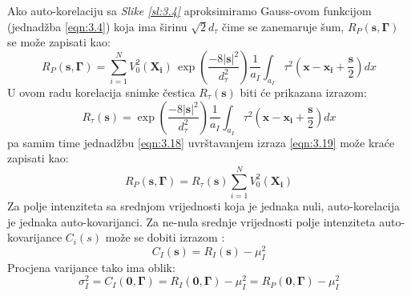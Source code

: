 \par
Ako auto-korelaciju sa \textit{Slike \ref{sl:3.4}} aproksimiramo Gauss-ovom funkcijom (jednadžba \ref{eqn:3.4}) koja ima širinu $\sqrt{2}d_{\tau}$ čime se zanemaruje šum, $R_{P}(\boldsymbol{s},\boldsymbol{\Gamma})$ se može zapisati kao:
\begin{equation}
	R_{P}(\boldsymbol{s},\boldsymbol{\Gamma}) = \sum_{i=1}^{N}V_{0}^{2}(\boldsymbol{X_{i}})\, \exp \left(\dfrac{-8|\boldsymbol{s}|^{2}}{d_{\tau}^{2}}\right)\dfrac{1}{a_{I}}\int_{a_{I}}\tau^{2}\left(\boldsymbol{x}-\boldsymbol{x_{i}}+\dfrac{\boldsymbol{s}}{2}\right)dx
	\label{eqn:3.18}
\end{equation}
U ovom radu korelacija snimke čestica $R_{\tau}(\boldsymbol{s})$ biti će prikazana izrazom:
\begin{equation}
	R_{\tau}(\boldsymbol{s})=\exp \left(\dfrac{-8|\boldsymbol{s}|^{2}}{d_{\tau}^{2}}\right)\dfrac{1}{a_{I}}\int_{a_{I}}\tau^{2}\left(\boldsymbol{x}-\boldsymbol{x_{i}}+\dfrac{\boldsymbol{s}}{2}\right)dx
	\label{eqn:3.19}
\end{equation}
pa samim time jednadžbu \ref{eqn:3.18} uvrštavanjem izraza \ref{eqn:3.19} može kraće zapisati kao:
\begin{equation}
	R_{P}(\boldsymbol{s},\boldsymbol{\Gamma})=R_{\tau}(\boldsymbol{s})\sum_{i=1}^{N}V_{0}^{2}(\boldsymbol{X_{i}})
	\label{eqn:3.20}
\end{equation}
Za polje intenziteta sa srednjom vrijednosti koja je jednaka nuli, auto-korelacija je jednaka auto-kovarijanci. Za ne-nula srednje vrijednosti polje intenziteta auto-kovarijance $C_{i}(s)$ može se dobiti izrazom \cite{raffel2018_book}:
\begin{equation}
	C_{I}(\boldsymbol{s})=R_{I}(\boldsymbol{s})-\mu_{I}^{2}
	\label{eqn:3.21}
\end{equation}
Procjena varijance tako ima oblik:
\begin{equation}
	\sigma_{I}^{2}=C_{I}(\boldsymbol{0}, \boldsymbol{\Gamma})=R_{I}(\boldsymbol{0}, \boldsymbol{\Gamma})-\mu_{I}^{2}=R_{P}(\boldsymbol{0}, \boldsymbol{\Gamma})-\mu_{I}^{2}
	\label{eqn:3.22}
\end{equation}
\FloatBarrier
